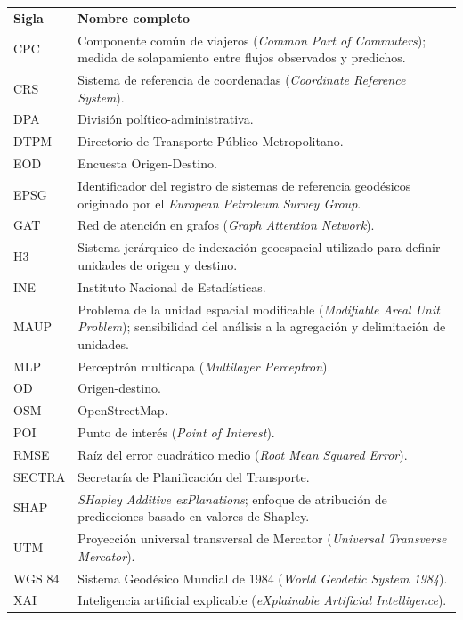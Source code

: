 
{\renewcommand{\arraystretch}{1.12}
\begin{tabularx}{\textwidth}{@{}>{\raggedright\arraybackslash}p{}@{\hspace{1.25em}}>{\raggedright\arraybackslash}X@{}}
\textbf{Sigla} & \textbf{Nombre completo} \\
CPC & Componente común de viajeros (\textit{Common Part of Commuters}); medida de solapamiento entre flujos observados y predichos. \\
CRS & Sistema de referencia de coordenadas (\textit{Coordinate Reference System}). \\
DPA & División político-administrativa. \\
DTPM & Directorio de Transporte Público Metropolitano. \\
EOD & Encuesta Origen-Destino. \\
EPSG & Identificador del registro de sistemas de referencia geodésicos originado por el \textit{European Petroleum Survey Group}. \\
GAT & Red de atención en grafos (\textit{Graph Attention Network}). \\
H3 & Sistema jerárquico de indexación geoespacial utilizado para definir unidades de origen y destino. \\
INE & Instituto Nacional de Estadísticas. \\
MAUP & Problema de la unidad espacial modificable (\textit{Modifiable Areal Unit Problem}); sensibilidad del análisis a la agregación y delimitación de unidades. \\
MLP & Perceptrón multicapa (\textit{Multilayer Perceptron}). \\
OD & Origen-destino. \\
OSM & OpenStreetMap. \\
POI & Punto de interés (\textit{Point of Interest}). \\
RMSE & Raíz del error cuadrático medio (\textit{Root Mean Squared Error}). \\
SECTRA & Secretaría de Planificación del Transporte. \\
SHAP & \textit{SHapley Additive exPlanations}; enfoque de atribución de predicciones basado en valores de Shapley. \\
UTM & Proyección universal transversal de Mercator (\textit{Universal Transverse Mercator}). \\
WGS 84 & Sistema Geodésico Mundial de 1984 (\textit{World Geodetic System 1984}). \\
XAI & Inteligencia artificial explicable (\textit{eXplainable Artificial Intelligence}).
\end{tabularx}
}
